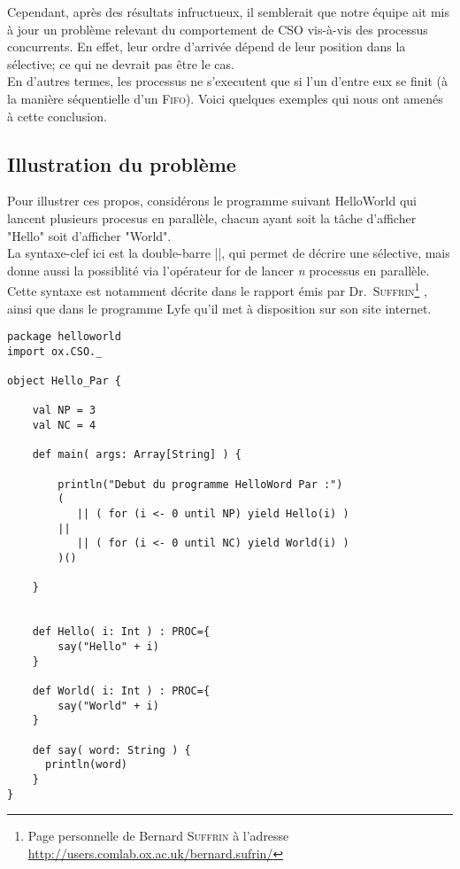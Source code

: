 \documentclass[a4paper,11pt,french]{report}
\begin{document}
Cependant, après des résultats infructueux, il semblerait que notre équipe ait mis à jour un problème relevant du comportement de CSO vis-à-vis des processus concurrents. En effet, leur ordre d'arrivée dépend de leur position dans la sélective; ce qui ne devrait pas être le cas.\\ 

En d'autres termes, les processus ne s'executent que si l'un d'entre eux se finit (à la manière séquentielle d'un \textsc{Fifo}). Voici quelques exemples qui nous ont amenés à cette conclusion.

\subsection{Illustration du problème}

Pour illustrer ces propos, considérons le programme suivant \textsf{HelloWorld} qui lancent plusieurs procesus en parallèle, chacun ayant soit la tâche d'afficher "Hello" soit d'afficher "World".\\
La syntaxe-clef ici est la double-barre ||, qui permet de décrire une sélective, mais donne aussi la possiblité via l'opérateur \textsf{for} de lancer \textit{n} processus en parallèle.\\
Cette syntaxe est notamment décrite dans le rapport émis par Dr.\ \textsc{Suffrin}\footnote{Page personnelle de Bernard \textsc{Suffrin} à l'adresse \url{http://users.comlab.ox.ac.uk/bernard.sufrin/}} \cite{cpa2008-cso}, ainsi que dans le programme Lyfe qu'il met à disposition sur son site internet.
\medskip

\begin{lstlisting}[frame=trBL]
package helloworld
import ox.CSO._

object Hello_Par {

    val NP = 3
    val NC = 4
    
    def main( args: Array[String] ) {
  
        println("Debut du programme HelloWord Par :")
        ( 
           || ( for (i <- 0 until NP) yield Hello(i) )
        || 
           || ( for (i <- 0 until NC) yield World(i) )
        )()
        
    }


    def Hello( i: Int ) : PROC={
    	say("Hello" + i)
    } 

    def World( i: Int ) : PROC={
    	say("World" + i)
    }

    def say( word: String ) {
      println(word)
    }  
}
\end{lstlisting}
\end{document}
